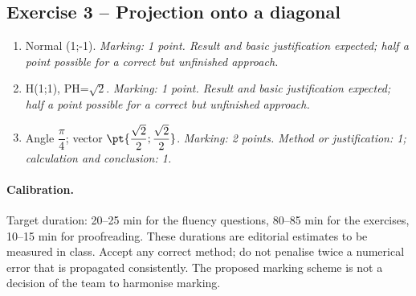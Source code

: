 \subsection*{Exercise 3 -- Projection onto a diagonal}
\begin{enumerate}
\item Normal (1;-1). \textit{Marking: 1 point. Result and basic justification expected; half a point possible for a correct but unfinished approach.}
\item H(1;1), PH=$\sqrt2$. \textit{Marking: 1 point. Result and basic justification expected; half a point possible for a correct but unfinished approach.}
\item Angle $\dfrac{\pi}{4}$; vector $\pt{\dfrac{\sqrt 2}{2};\dfrac{\sqrt 2}{2}}$. \textit{Marking: 2 points. Method or justification: 1; calculation and conclusion: 1.}
\end{enumerate}
\paragraph{Calibration.} Target duration: 20--25 min for the fluency questions, 80--85 min for the exercises, 10--15 min for proofreading. These durations are editorial estimates to be measured in class. Accept any correct method; do not penalise twice a numerical error that is propagated consistently. The proposed marking scheme is not a decision of the team to harmonise marking.
